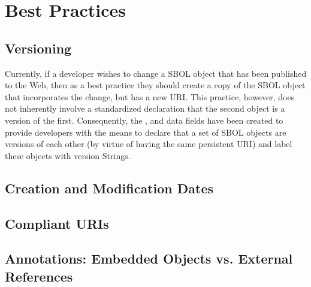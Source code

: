 \section{Best Practices}
\label{sec:bestpractices}
\subsection{Versioning}
Currently, if a developer wishes to change a SBOL object that has been published to the Web, then as a best practice they should create a copy of the SBOL object that incorporates the change, but has a new URI. This practice, however, does not inherently involve a standardized declaration that the second object is a version of the first. Consequently, the , and  data fields have been created to provide developers with the means to declare that a set of SBOL objects are versions of each other (by virtue of having the same persistent URI) and label these objects with version Strings.


\subsection{Creation and Modification Dates}


\subsection{Compliant URIs}


\subsection{Annotations: Embedded Objects vs. External References}


